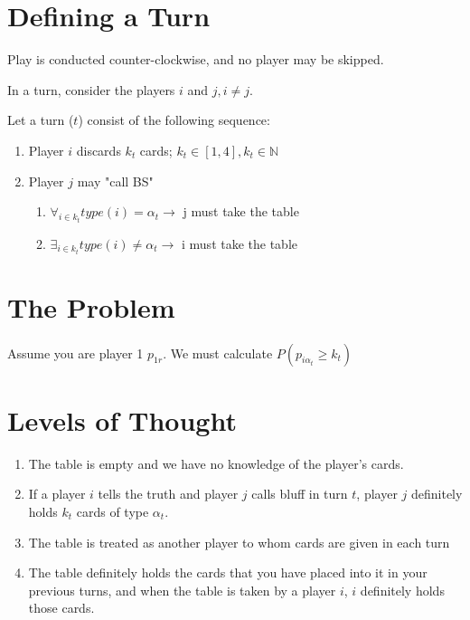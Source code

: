 \documentclass[letterpaper,11pt]{report}
\begin{document}
\begin{description}
    \section{Defining a Turn}
    \item Play is conducted counter-clockwise, and no player may be skipped.
    \item In a turn, consider the players $i$ and $j, i \neq j$.
    \item Let a turn ($t$) consist of the following sequence:
    \begin{enumerate}
        \item Player $i$ discards $k_t$ cards; $k_t \in [1,4], k_t \in \mathbb{N}$
        \item Player $j$ may "call BS"
        \begin{enumerate}
            \item $\forall_{i\in k_t} type(i) = \alpha_t \rightarrow$ j must take the table
            \item $\exists_{i\in k_t} type(i) \neq \alpha_t \rightarrow$ i must take the table
        \end{enumerate}
    \end{enumerate}
    \section{The Problem}
    \paragraph{} Assume you are player 1 $p_{1 r}$. We must calculate $P(p_{i \alpha_t} \geq k_t)$
    \section{Levels of Thought}
    \begin{enumerate}
        \item The table is empty and we have no knowledge of the player's cards.
        \item If a player $i$ tells the truth and player $j$ calls bluff in turn $t$, player $j$ definitely holds $k_t$ cards of type $\alpha_t$.
        \item The table is treated as another player to whom cards are given in each turn
        \item The table definitely holds the cards that you have placed into it in your previous turns, and when the table is taken by a player $i$, $i$ definitely holds those cards.
    \end{enumerate}
\end{description}
\end{document}
